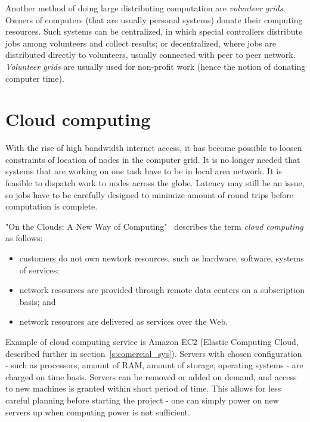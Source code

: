 Another method of doing large distributing computation are \emph{volunteer grids}. Owners of computers (that are usually personal systems) donate their computing resources. Such systems can be centralized, in which special controllers distribute jobs among volunteers and collect results; or decentralized, where jobs are distributed directly to volunteers, usually connected with peer to peer network. \emph{Volunteer grids} are usually used for non-profit work (hence the notion of donating computer time).

\section{Cloud computing}

With the rise of high bandwidth internet access, it has become possible to loosen constraints of location of nodes in the computer grid. It is no longer needed that systems that are working on one task have to be in local area network. It is feasible to dispatch work to nodes across the globe. Latency may still be an issue, so jobs have to be carefully designed to minimize amount of round trips before computation is complete.

\begin{comment}
Han-OnTheClouds-2010.pdf
\end{comment}

"On the Clouds: A New Way of Computing"~\cite{han2013clouds} describes the term \emph{cloud computing} as follows:
\begin{itemize}
\item customers do not own newtork resources, such as hardware, software, systems of services;
\item network resources are provided through remote data centers on a subscription basis; and
\item network resources are delivered as services over the Web.
\end{itemize}

Example of cloud computing service is Amazon EC2 (Elastic Computing Cloud, described further in section~\ref{s:comercial_sys}). Servers with chosen configuration - such as processors, amount of RAM, amount of storage, operating systems - are charged on time basis. Servers can be removed or added on demand, and access to new machines is granted within short period of time. This allows for less careful planning before starting the project - one can simply power on new servers up when computing power is not sufficient.

